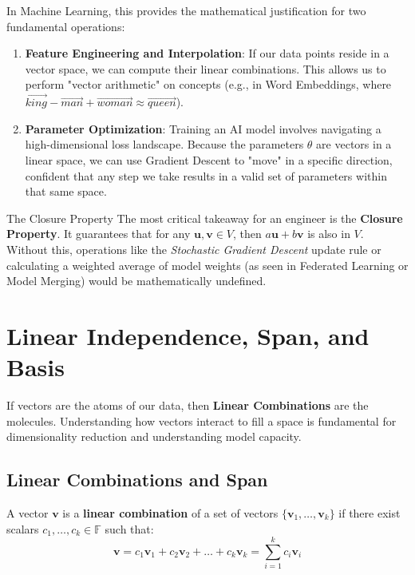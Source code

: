 In Machine Learning, this provides the mathematical justification for two fundamental operations:

\begin{enumerate}
    \item \textbf{Feature Engineering and Interpolation}: If our data points reside in a vector space, we can compute their linear combinations. This allows us to perform "vector arithmetic" on concepts (e.g., in Word Embeddings, where $\vec{king} - \vec{man} + \vec{woman} \approx \vec{queen}$).
    \item \textbf{Parameter Optimization}: Training an AI model involves navigating a high-dimensional loss landscape. Because the parameters $\theta$ are vectors in a linear space, we can use Gradient Descent to "move" in a specific direction, confident that any step we take results in a valid set of parameters within that same space.
\end{enumerate}



\begin{unibobox}{The Closure Property}
    The most critical takeaway for an engineer is the \textbf{Closure Property}. It guarantees that for any $\mathbf{u}, \mathbf{v} \in V$, then $a\mathbf{u} + b\mathbf{v}$ is also in $V$. Without this, operations like the \textit{Stochastic Gradient Descent} update rule or calculating a weighted average of model weights (as seen in Federated Learning or Model Merging) would be mathematically undefined.
\end{unibobox}


\section{Linear Independence, Span, and Basis}

If vectors are the atoms of our data, then \textbf{Linear Combinations} are the molecules. Understanding how vectors interact to fill a space is fundamental for dimensionality reduction and understanding model capacity.

\subsection{Linear Combinations and Span}
A vector $\mathbf{v}$ is a \textbf{linear combination} of a set of vectors $\{\mathbf{v}_1, \dots, \mathbf{v}_k\}$ if there exist scalars $c_1, \dots, c_k \in \mathbb{F}$ such that:
\begin{equation}
    \mathbf{v} = c_1\mathbf{v}_1 + c_2\mathbf{v}_2 + \dots + c_k\mathbf{v}_k = \sum_{i=1}^k c_i\mathbf{v}_i
\end{equation}

